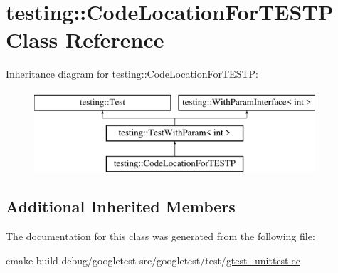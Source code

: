\hypertarget{classtesting_1_1CodeLocationForTESTP}{}\section{testing\+::Code\+Location\+For\+T\+E\+S\+TP Class Reference}
\label{classtesting_1_1CodeLocationForTESTP}
Inheritance diagram for testing\+::Code\+Location\+For\+T\+E\+S\+TP\+:\begin{figure}[H]
\begin{center}
\leavevmode
\includegraphics[height=3.000000cm]{classtesting_1_1CodeLocationForTESTP}
\end{center}
\end{figure}
\subsection*{Additional Inherited Members}


The documentation for this class was generated from the following file\+:\begin{DoxyCompactItemize}
\item 
cmake-\/build-\/debug/googletest-\/src/googletest/test/\mbox{\hyperlink{gtest__unittest_8cc}{gtest\+\_\+unittest.\+cc}}\end{DoxyCompactItemize}
